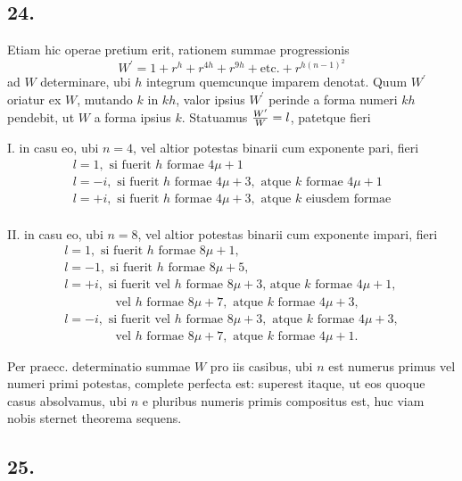 \documentclass[twoside,12pt, showframe]{memoir}
\let\oldfrac\frac
\def\frac#1#2{\mathchoice{\tfrac{#1}{#2}}{\oldfrac{#1}{#2}}{\genfrac{}{}{}{2}{#1}{#2\mathstrut}}{\genfrac{}{}{}{3}{#1}{#2\mathstrut}}}
\begin{document}
\subsection*{24.}
 
Etiam hic operae pretium erit, rationem summae progressionis
\[W^{\prime}=1+r^{h}+r^{4 h}+r^{9 h}+\text{etc.}+r^{h(n-1)^{2}}\]
ad \(W\) determinare, ubi \(h\) integrum quemcunque imparem denotat. Quum \(W^{\prime}\) oriatur ex \(W\), mutando \(k\) in \(k h\), valor ipsius \(W^{\prime}\) perinde a forma numeri \(k h\) pendebit, ut \(W\) a forma ipsius \(k\). Statuamus \(\frac{W^{\prime}}{W}=l\), patetque fieri
 
I. in casu eo, ubi \(n=4\), vel altior potestas binarii cum exponente pari, fieri\\
\[\begin{array}{l}
l=1,\text{ si fuerit }h\text{ formae }4\mu+1\\ 
l=-i,\text{ si fuerit }h\text{ formae }4 \mu+3,\text{ atque }k\text{ formae }4 \mu+1\\
l=+i,\text{ si fuerit }h\text{ formae }4 \mu+3,\text{ atque }k\text{ eiusdem formae}\\
\end{array}\]\clearpage\noindent%
 
II. in casu eo, ubi \(n=8\), vel altior potestas binarii cum exponente impari, fieri
\[\begin{array}{l} 
l=1, \text{ si fuerit } h \text{ formae } 8 \mu+1, \\
l=-1, \text{ si fuerit } h \text{ formae } 8 \mu+5, \\
l=+i, \text{ si fuerit vel } h \text{ formae } 8 \mu+3 \text{, atque } k \text{ formae } 4 \mu+1,\\
\phantom{l=+i} \quad \text{ vel } h \text{ formae } 8 \mu+7, \text{ atque } k \text{ formae } 4 \mu+3,\\
l=-i, \text{ si fuerit vel } h \text{ formae } 8 \mu+3, \text{ atque } k \text{ formae } 4 \mu+3, \\
\phantom{l=-i}\quad \text{ vel } h \text{ formae } 8 \mu+7, \text{ atque } k \text{ formae } 4 \mu+1.
\end{array}\]
 
Per praecc. determinatio summae \(W\) pro iis casibus, ubi \(n\) est numerus primus vel numeri primi potestas, complete perfecta est: superest itaque, ut eos quoque casus absolvamus, ubi \(n\) e pluribus numeris primis compositus est, huc viam nobis sternet theorema sequens.

\subsection*{25.}
 
\end{document}
